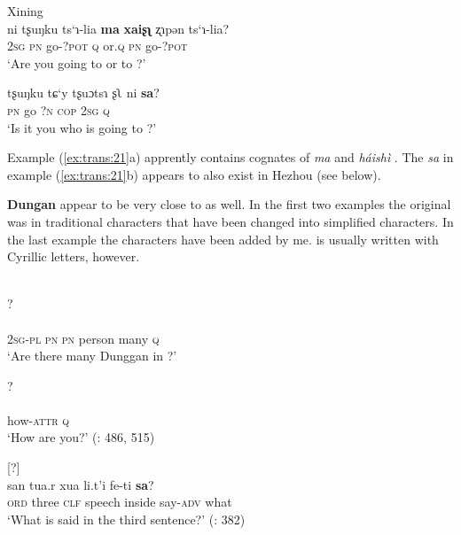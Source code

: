 \ea%
    \label{ex:trans:21}
    Xining \\
    \ea
    \gll ni  tʂuŋku    ts‘ɿ-lia \textbf{{ma}} \textbf{{xai}}\textbf{{ʂ}}\textbf{{ʅ}} ʐɿpən  ts‘ɿ-lia?\\
    2\textsc{sg}  \textsc{pn}    go-?\textsc{pot}  \textsc{q}  or.\textsc{q}  \textsc{pn}  go-?\textsc{pot}\\
    \glt ‘Are you going to  or to ?’
    
    \ex
    \gll tʂuŋku    tɕ‘y  tʂuɔtsɿ {ʂʅ} {ni} \textbf{{sa}}?\\
    \textsc{pn}    go  ?\textsc{n}    \textsc{cop}  2\textsc{sg}  \textsc{q}\\
    \glt ‘Is it you who is going to ?’
    \z
    \z

\noindent Example (\ref{ex:trans:21}a) apprently contains cognates of  \textit{ma}  and \textit{háishì} . The  \textit{sa} in example (\ref{ex:trans:21}b) appears to also exist in Hezhou  (see below).

\textbf{Dungan}  appear to be very close to  as well. In the first two examples the original was in traditional characters that have been changed into simplified characters. In the last example the  characters have been added by me.  is usually written with Cyrillic letters, however.

\ea%
    \label{ex:trans:22}
    \\
    \ea
    ?\\
    \\
    2\textsc{sg}-\textsc{pl}    \textsc{pn}    \textsc{pn}    person  many  \textsc{q}\\
    \glt ‘Are there many Dunggan in ?’
    
    \ex
    ?\\
    \\
    how-\textsc{attr}  \textsc{q}\\
    \glt ‘How are you?’ (\citealt{Rimsky-Korsakoff1994}: 486, 515)
    
    \ex{}
    [?]\\
     {san} {tua.r} {xua} li.t’i  fe-ti \textbf{{sa}}?\\
    \textsc{ord}  three  \textsc{clf}  speech    inside  say-\textsc{adv}  what\\
    \glt ‘What is said in the third sentence?’ (\citealt{Rimsky-Korsakoff1967}: 382)\footnotemark
    \z
    \z

